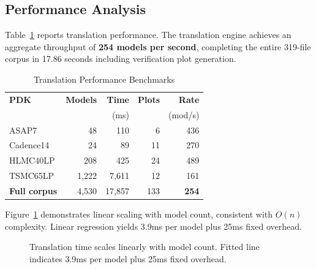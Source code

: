\documentclass[conference]{IEEEtran}
\begin{document}
\subsection{Performance Analysis}

Table~\ref{tab:performance} reports translation performance. The translation engine achieves an aggregate throughput of \textbf{254 models per second}, completing the entire 319-file corpus in 17.86 seconds including verification plot generation.

\begin{table}[!t]
\caption{Translation Performance Benchmarks}
\label{tab:performance}
\centering
\renewcommand{\arraystretch}{1.15}
\begin{tabular}{@{}lrrrr@{}}
\toprule
\textbf{PDK} & \textbf{Models} & \textbf{Time} & \textbf{Plots} & \textbf{Rate} \\
 & & (ms) & & (mod/s) \\
\midrule
ASAP7 & 48 & 110 & 6 & 436 \\
Cadence14 & 24 & 89 & 11 & 270 \\
HLMC40LP & 208 & 425 & 24 & 489 \\
TSMC65LP & 1,222 & 7,611 & 12 & 161 \\
\midrule
\textbf{Full corpus} & 4,530 & 17,857 & 133 & \textbf{254} \\
\bottomrule
\end{tabular}
\end{table}

Figure~\ref{fig:scaling} demonstrates linear scaling with model count, consistent with $O(n)$ complexity. Linear regression yields 3.9ms per model plus 25ms fixed overhead.

\begin{figure}[!t]
\centering
{}
\caption{Translation time scales linearly with model count. Fitted line indicates 3.9ms per model plus 25ms fixed overhead.}
\label{fig:scaling}
\end{figure}
\end{document}
